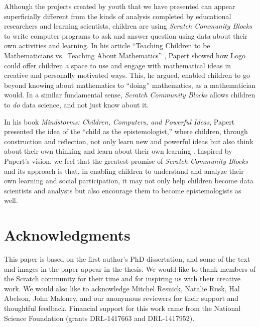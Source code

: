 \documentclass{sigchi}
\begin{document}
Although the projects created by youth that we have presented can appear superficially different from the kinds of analysis completed by educational researchers and learning scientists, children are using \emph{Scratch Community Blocks} to write computer programs to ask and answer question using data about their own activities and learning. In his article ``Teaching Children to be Mathematicians vs.~Teaching About Mathematics'' \cite{papert_teaching_1971}, Papert showed how Logo could offer children a space to use and engage with mathematical ideas in creative and personally motivated ways. This, he argued, enabled children to go beyond knowing about mathematics to ``doing'' mathematics, as a mathematician would. In a similar fundamental sense, \emph{Scratch Community Blocks} allows children to \emph{do} data science, and not just know about it.

In his book \emph{Mindstorms: Children, Computers, and Powerful Ideas}, Papert presented the idea of the ``child as the epistemologist,'' where children, through construction and reflection, not only learn new and powerful ideas but also think about their own thinking and learn about their own learning \cite{papert_mindstorms:_1980}. Inspired by Papert's vision, we feel that the greatest promise of \emph{Scratch Community Blocks} and its approach is that, in enabling children to understand and analyze their own learning and social participation, it may not only help children become data scientists and analysts but also encourage them to become epistemologists as well.

\section{Acknowledgments}

This paper is based on the first author's PhD dissertation, and some of the text and images in the paper appear in the thesis. We would like to thank members of the Scratch community for their time and for inspiring us with their creative work. We would also like to acknowledge Mitchel Resnick, Natalie Rusk, Hal Abelson, John Maloney, and our anonymous reviewers for their support and thoughtful feedback. Financial support for this work came from the National Science Foundation (grants DRL-1417663 and DRL-1417952).

\balance


\end{document}
